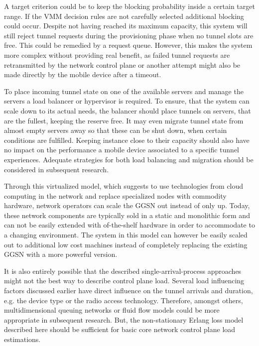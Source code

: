 A target criterion could be to keep the blocking probability inside a certain target range. If the \gls{VMM} decision rules are not carefully selected additional blocking could occur. Despite not having reached its maximum capacity, this system will still reject tunnel requests during the provisioning phase when no tunnel slots are free. This could be remedied by a request queue. However, this makes the system more complex without providing real benefit, as failed tunnel requests are retransmitted by the network control plane or another attempt might also be made directly by the mobile device after a timeout.

To place incoming tunnel state on one of the available servers and manage the servers a load balancer or hypervisor is required. To ensure, that the system can scale down to its actual needs, the balancer should place tunnels on servers, that are the fullest, keeping the reserve free. It may even migrate tunnel state from almost empty servers away so that these can be shut down, when certain conditions are fulfilled. Keeping instance close to their capacity should also have no impact on the performance a mobile device associated to a specific tunnel experiences. Adequate strategies for both load balancing and migration should be considered in subsequent research.

Through this virtualized model, which suggests to use technologies from cloud computing in the network and replace specialized nodes with commodity hardware, network operators can scale the \gls{GGSN} out instead of only up. Today, these network components are typically sold in a static and monolithic form and can not be easily extended with of-the-shelf hardware in order to accommodate to a changing environment. The system in this model can however be easily scaled out to additional low cost machines instead of completely replacing the existing \gls{GGSN} with a more powerful version. 

It is also entirely possible that the described single-arrival-process approaches might not the best way to describe control plane load. Several load influencing factors discussed earlier have direct influence on the tunnel arrivals and duration, e.g. the device type or the radio access technology. Therefore, amongst others, multidimensional queuing networks or fluid flow models could be more appropriate in subsequent research. But, the non-stationary Erlang loss model described here should be sufficient for basic core network control plane load estimations.

